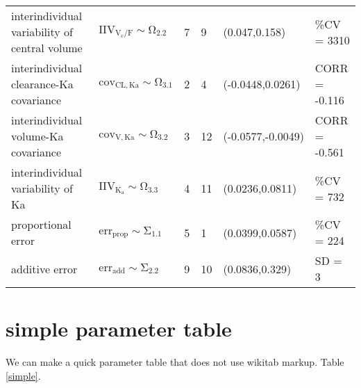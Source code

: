 \begin{table}[!htpb]
\begin{center}
\begin{tabular}{llllll}
   interindividual variability of central volume & $\mathrm{IIV_{V_{c}/F}\sim \Omega_{2.2}}$                                                                  & 7 $  $      & 9  & (0.047,0.158)     & \%CV = 3310  \\
   interindividual clearance-Ka covariance       & $\mathrm{cov_{CL,Ka} \sim \Omega_{3.1}}$                                                                   & 2 $  $      & 4  & (-0.0448,0.0261)  & CORR = -0.116 \\
   interindividual volume-Ka covariance          & $\mathrm{cov_{V,Ka} \sim \Omega_{3.2}}$                                                                    & 3 $  $      & 12 & (-0.0577,-0.0049) & CORR = -0.561 \\
   interindividual variability of Ka             & $\mathrm{IIV_{K_{a}}\sim \Omega_{3.3}}$                                                                    & 4 $  $      & 11 & (0.0236,0.0811)   & \%CV = 732   \\
   proportional error                            & $\mathrm{err_{prop}\sim \Sigma_{1.1}}$                                                                     & 5 $  $      & 1  & (0.0399,0.0587)   & \%CV = 224   \\
   additive error                                & $\mathrm{err_{add}\sim \Sigma_{2.2}}$                                                                      & 9 $  $      & 10 & (0.0836,0.329)    & SD = 3        \\ \hline
  \end{tabular}
 \end{center}
\end{table}\section{simple parameter table}
We can make a quick parameter table that does not use wikitab markup. Table \ref{simple}.
